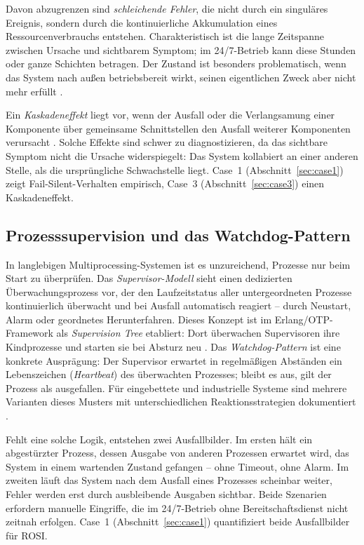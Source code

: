 Davon abzugrenzen sind \textit{schleichende Fehler}, die nicht durch ein singuläres
Ereignis, sondern durch die kontinuierliche Akkumulation eines Ressourcenverbrauchs
entstehen. Charakteristisch ist die lange Zeitspanne zwischen Ursache und sichtbarem
Symptom; im 24/7-Betrieb kann diese Stunden oder ganze Schichten betragen. Der Zustand
ist besonders problematisch, wenn das System nach außen betriebsbereit wirkt, seinen
eigentlichen Zweck aber nicht mehr erfüllt \cite{birman2012}.

Ein \textit{Kaskadeneffekt} liegt vor, wenn der Ausfall oder die Verlangsamung einer
Komponente über gemeinsame Schnittstellen den Ausfall weiterer Komponenten verursacht
\cite{ieee_cascade2016}. Solche Effekte sind schwer zu diagnostizieren, da das sichtbare
Symptom nicht die Ursache widerspiegelt: Das System kollabiert an einer anderen Stelle,
als die ursprüngliche Schwachstelle liegt. Case~1 (Abschnitt~\ref{sec:case1}) zeigt
Fail-Silent-Verhalten empirisch, Case~3 (Abschnitt~\ref{sec:case3}) einen Kaskadeneffekt.

\subsection{Prozesssupervision und das Watchdog-Pattern}
\label{sec:grundlagen-supervision}

In langlebigen Multiprocessing-Systemen ist es unzureichend, Prozesse nur beim Start zu
überprüfen. Das \textit{Supervisor-Modell} sieht einen dedizierten Überwachungsprozess
vor, der den Laufzeitstatus aller untergeordneten Prozesse kontinuierlich überwacht und
bei Ausfall automatisch reagiert -- durch Neustart, Alarm oder geordnetes Herunterfahren.
Dieses Konzept ist im Erlang/OTP-Framework als \textit{Supervision Tree} etabliert: Dort
überwachen Supervisoren ihre Kindprozesse und starten sie bei Absturz neu
\cite{armstrong2007}. Das \textit{Watchdog-Pattern} ist eine konkrete Ausprägung: Der
Supervisor erwartet in regelmäßigen Abständen ein Lebenszeichen (\textit{Heartbeat}) des
überwachten Prozesses; bleibt es aus, gilt der Prozess als ausgefallen. Für eingebettete
und industrielle Systeme sind mehrere Varianten dieses Musters mit unterschiedlichen
Reaktionsstrategien dokumentiert \cite{pont_watchdog}.

Fehlt eine solche Logik, entstehen zwei Ausfallbilder. Im ersten hält ein
abgestürzter Prozess, dessen Ausgabe von anderen Prozessen erwartet wird, das System in
einem wartenden Zustand gefangen -- ohne Timeout, ohne Alarm. Im zweiten läuft das System
nach dem Ausfall eines Prozesses scheinbar weiter, Fehler werden erst durch ausbleibende
Ausgaben sichtbar. Beide Szenarien erfordern manuelle Eingriffe, die im 24/7-Betrieb ohne
Bereitschaftsdienst nicht zeitnah erfolgen. Case~1 (Abschnitt~\ref{sec:case1}) quantifiziert
beide Ausfallbilder für ROSI.

